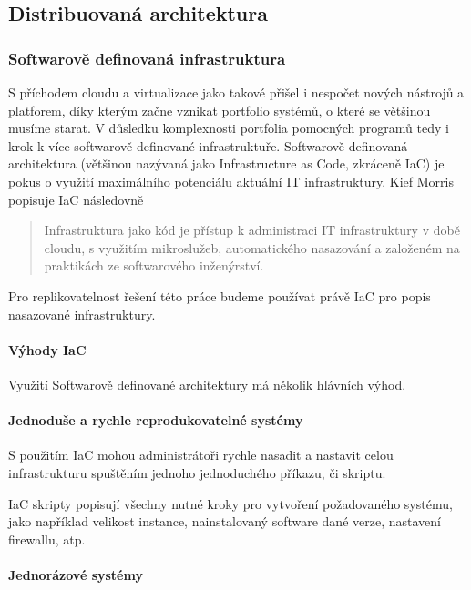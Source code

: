 \documentclass[thesis=M,czech]{FITthesis}[2019/12/23]
\theoremstyle{plain}
\theoremstyle{definition}
\begin{document}
\subsection{Distribuovaná architektura}


\subsubsection{Softwarově definovaná infrastruktura}

S příchodem cloudu a virtualizace jako takové přišel i nespočet nových nástrojů a platforem, díky kterým začne vznikat portfolio systémů, o které se většinou musíme starat. V důsledku komplexnosti portfolia pomocných programů tedy i krok k více softwarově definované infrastruktuře. Softwarově definovaná architektura (většinou nazývaná jako Infrastructure as Code, zkráceně IaC) je pokus o využití maximálního potenciálu aktuální IT infrastruktury. Kief Morris popisuje IaC následovně


\begin{quotation}
Infrastruktura jako kód je přístup k administraci IT infrastruktury v době cloudu, s využitím mikroslužeb, automatického nasazování a založeném na praktikách ze softwarového inženýrství.  
\end{quotation}

Pro replikovatelnost řešení této práce budeme používat právě IaC pro popis nasazované infrastruktury.

\paragraph{Výhody IaC}

Využití Softwarově definované architektury má několik hlávních výhod.

\paragraph{Jednoduše a rychle reprodukovatelné systémy}

S použitím IaC mohou administrátoři rychle nasadit a nastavit celou infrastrukturu spuštěním jednoho jednoduchého příkazu, či skriptu.

IaC skripty popisují všechny nutné kroky pro vytvoření požadovaného systému, jako například velikost instance, nainstalovaný software dané verze, nastavení firewallu, atp.

\paragraph{Jednorázové systémy}
\end{document}

